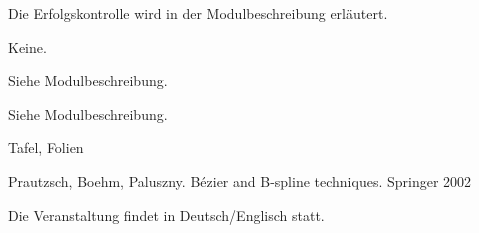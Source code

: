 \begin{course}

\setdoclanguagegerman
{}


\courseinstructionlanguage{}

\coursehead


\label{cour_15889.dp_997}


\begin{styleenv}
\begin{assessment}
Die Erfolgskontrolle wird in der Modulbeschreibung erläutert.


\end{assessment}

\begin{conditions}Keine.\end{conditions}


\end{styleenv}

\begin{learningoutcomes}
Siehe Modulbeschreibung.


\end{learningoutcomes}

\begin{content}
Siehe Modulbeschreibung.


\end{content}

\begin{media}Tafel, Folien

\end{media}

\begin{literature}Prautzsch, Boehm, Paluszny. Bézier and B-spline techniques. Springer 2002

\end{literature}

\begin{remarks}Die Veranstaltung findet in Deutsch/Englisch statt.

\end{remarks}

\end{course}